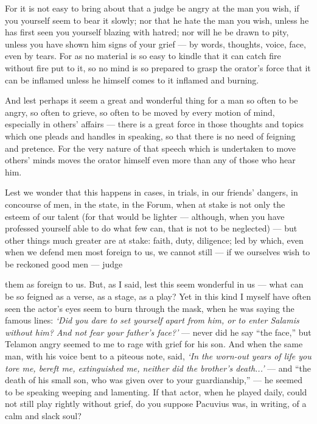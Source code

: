  For it is not easy to bring about that a judge be angry at the man you wish, if you yourself seem to bear it slowly; nor that he hate the man you wish, unless he has first seen you yourself blazing with hatred; nor will he be drawn to pity, unless you have shown him signs of your grief — by words, thoughts, voice, face, even by tears. For as no material is so easy to kindle that it can catch fire without fire put to it, so no mind is so prepared to grasp the orator's force that it can be inflamed unless he himself comes to it inflamed and burning.

 And lest perhaps it seem a great and wonderful thing for a man so often to be angry, so often to grieve, so often to be moved by every motion of mind, especially in others' affairs — there is a great force in those thoughts and topics which one pleads and handles in speaking, so that there is no need of feigning and pretence. For the very nature of that speech which is undertaken to move others' minds moves the orator himself even more than any of those who hear him.

 Lest we wonder that this happens in cases, in trials, in our friends' dangers, in concourse of men, in the state, in the Forum, when at stake is not only the esteem of our talent (for that would be lighter — although, when you have professed yourself able to do what few can, that is not to be neglected) — but other things much greater are at stake: faith, duty, diligence; led by which, even when we defend men most foreign to us, we cannot still — if we ourselves wish to be reckoned good men — judge

 them as foreign to us. But, as I said, lest this seem wonderful in us — what can be so feigned as a verse, as a stage, as a play? Yet in this kind I myself have often seen the actor's eyes seem to burn through the mask, when he was saying the famous lines: \textit{`Did you dare to set yourself apart from him, or to enter Salamis without him? And not fear your father's face?'} — never did he say ``the face,'' but Telamon angry seemed to me to rage with grief for his son. And when the same man, with his voice bent to a piteous note, said, \textit{`In the worn-out years of life you tore me, bereft me, extinguished me, neither did the brother's death...'} — and ``the death of his small son, who was given over to your guardianship,'' — he seemed to be speaking weeping and lamenting. If that actor, when he played daily, could not still play rightly without grief, do you suppose Pacuvius was, in writing, of a calm and slack soul?

